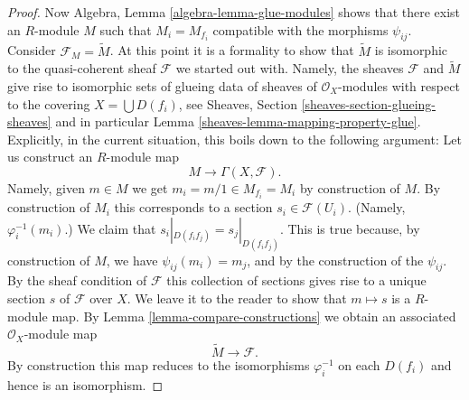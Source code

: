 \begin{proof}
\medskip\noindent
Now Algebra, Lemma \ref{algebra-lemma-glue-modules}
shows that there exist an $R$-module $M$ such that
$M_i = M_{f_i}$ compatible with the morphisms $\psi_{ij}$.
Consider $\mathcal{F}_M = \widetilde M$. At this point it is
a formality to show that $\widetilde M$ is isomorphic to
the quasi-coherent sheaf $\mathcal{F}$ we started out with.
Namely, the sheaves $\mathcal{F}$ and $\widetilde M$ give
rise to isomorphic sets of glueing data of sheaves of $\mathcal{O}_X$-modules
with respect to the covering $X = \bigcup D(f_i)$, see
Sheaves, Section \ref{sheaves-section-glueing-sheaves}
and in particular Lemma \ref{sheaves-lemma-mapping-property-glue}.
Explicitly, in the current situation, this boils down to
the following argument: Let us construct an $R$-module map
$$
M \longrightarrow \Gamma(X, \mathcal{F}).
$$
Namely, given $m \in M$ we get $m_i = m/1 \in M_{f_i} = M_i$
by construction of $M$. By construction of $M_i$ this corresponds
to a section $s_i \in \mathcal{F}(U_i)$. (Namely, $\varphi^{-1}_i(m_i)$.)
We claim that $s_i|_{D(f_if_j)} = s_j|_{D(f_if_j)}$. This is
true because, by construction of $M$, we have $\psi_{ij}(m_i) = m_j$,
and by the construction of the $\psi_{ij}$. By the sheaf condition of
$\mathcal{F}$ this collection of sections gives rise to a unique
section $s$ of $\mathcal{F}$ over $X$. We leave it to the reader
to show that $m \mapsto s$ is a $R$-module map.
By Lemma \ref{lemma-compare-constructions} we obtain an associated
$\mathcal{O}_X$-module map
$$
\widetilde M \longrightarrow \mathcal{F}.
$$
By construction this map reduces to the isomorphisms
$\varphi_i^{-1}$ on each $D(f_i)$ and hence is an isomorphism.
\end{proof}

